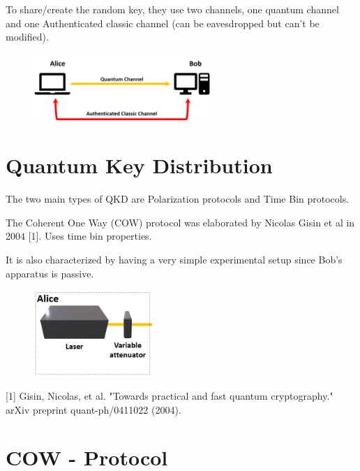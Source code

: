 \documentclass[1000pt]{article}
\newcommand{\mysection}[1]{\section*{\color{black}\sffamily #1}}%
\begin{document}
To share/create the random key, they use two channels, one quantum channel and one Authenticated classic channel (can be eavesdropped but can't be modified).

  \begin{figure}[hbt]
    	\centering
    	\includegraphics[width=0.6\textwidth]{./figures/Full.png}
    \end{figure}




\mysection{\Huge Quantum Key Distribution} \Large
\vspace*{1cm}
The two main types of QKD are Polarization protocols and Time Bin protocols.

The Coherent One Way (COW) protocol was elaborated by Nicolas Gisin et al in 2004 [1]. 
Uses time bin properties.

It is also characterized by having a very simple experimental setup since Bob's apparatus is passive.

    \begin{figure}[hbt]
    	\centering
    	\includegraphics[width=0.4\textwidth]{./figures/Alice.png}
        	\label{bob}
    \end{figure}

\large
[1] Gisin, Nicolas, et al. "Towards practical and fast quantum cryptography." arXiv preprint quant-ph/0411022 (2004).



\mysection{\Huge COW - Protocol}\Large
\vspace*{0.3cm}
\end{document}
